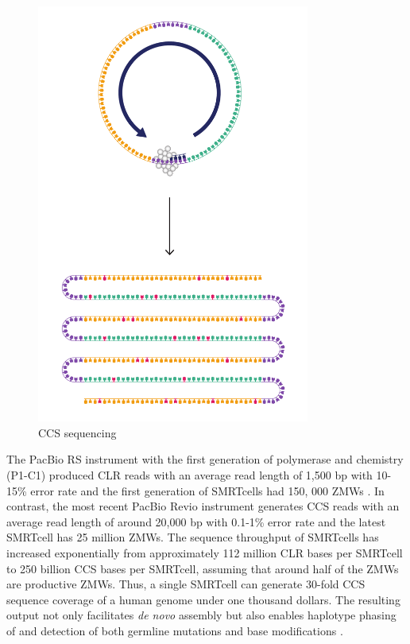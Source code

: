 \begin{figure}[htbp!]
\caption{CCS sequencing}
\label{figure:ccs-sequencing}
\begin{centering}
\includegraphics[width=0.8\textwidth]{Vector/CCS_sequencing.pdf}
\end{centering}
\end{figure}

The PacBio RS instrument with the first generation of polymerase and chemistry (P1-C1) produced CLR reads with an average read length of 1,500 bp with 10-15\% error rate \cite{Quail2012-cx} and the first generation of SMRTcells had 150, 000 ZMWs \cite{Rhoads2015-pk}. In contrast, the most recent PacBio Revio instrument generates CCS reads with an average read length of around 20,000 bp with 0.1-1\% error rate \cite{revio2022} and the latest SMRTcell has 25 million ZMWs. The sequence throughput of SMRTcells has increased exponentially from approximately 112 million CLR bases per SMRTcell to 250 billion CCS bases per SMRTcell, assuming that around half of the ZMWs are productive ZMWs. Thus, a single SMRTcell can generate 30-fold CCS sequence coverage of a human genome under one thousand dollars. The resulting output not only facilitates \textit{de novo} assembly \cite{Nurk2020-gu, Cheng2021-ij} but also enables haplotype phasing of \cite{Patterson2015-an} and detection of both germline mutations \cite{Poplin2018-ub} and base modifications \cite{Tse2021-or}. 


